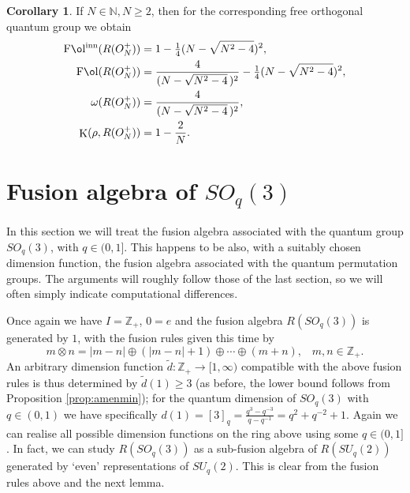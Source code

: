 \documentclass[11 pt, leqno]{amsart}
\newcommand{\NN}{\mathbb{N}}
\newcommand{\ZZ}{\mathbb{Z}}
\DeclareMathOperator{\Fol}{F\mathrm{\o}l}
\DeclareMathOperator{\Folinn}{F\mathrm{\o}l^{inn}}
\DeclareMathOperator{\Kaz}{K}
\theoremstyle{definition}
\newtheorem{corollary}[theorem]{Corollary}
\numberwithin{equation}{section}
\begin{document}

\begin{corollary} If $N\in \NN, N \geq 2$, then for the corresponding free orthogonal quantum group we obtain
\[\begin{split}
\Folinn(R(O_N^+)) &= 1 - \tfrac{1}{4} (N-\sqrt{N^2-4})^{2},\\
\Fol(R(O_N^+)) &=
\frac{4}{(N-\sqrt{N^2-4}\,)^{2}}
- \tfrac{1}{4} (N-\sqrt{N^2-4})^{2}, \\
\omega(R(O_N^+)) & = \frac{4}{(N-\sqrt{N^2-4}\,)^{2}}  , \\
\Kaz(\rho,R(O_N^+)) & = 1- \frac{2}{N}. 
\end{split}\]
\end{corollary}







\section{Fusion algebra of $SO_q(3)$}
\label{Sec:SO} 


In this section we will treat the fusion algebra associated with the quantum group $SO_q(3)$, with $q \in (0,1]$. This happens to be also, with a suitably chosen dimension function, the fusion algebra associated with the quantum permutation groups. The arguments will roughly follow those of the last section, so we will often simply  indicate  computational differences.

Once again we have $I=\ZZ_+$, $0=e$ and the fusion algebra $R(SO_q(3))$ is generated by $1$, with the fusion rules given this time by
\[ m \otimes n = |m-n| \oplus (|m-n|+1) \oplus \cdots \oplus (m+n), \;\;\; m,n \in \ZZ_+. \]
An arbitrary dimension function $\tilde{d}\colon \ZZ_+\to [1, \infty)$ compatible with the above fusion rules is thus determined by $\tilde{d}(1)\geq 3$ (as before, the lower bound follows from Proposition \ref{prop:amenmin}); for the quantum dimension of $SO_q(3)$ with $q \in (0,1)$ we have specifically $d(1)=[3]_q =\tfrac{q^3 - q^{-3}}{q- q^{-1}}= q^2 + q^{-2}+1$. Again we can realise all possible dimension functions on the ring above using some $q \in (0,1]$. In fact, we can study $R(SO_q(3))$ as a sub-fusion algebra of $R(SU_q(2))$ generated by `even' representations of $SU_q(2)$. This is clear from the fusion rules above and the next lemma.
\end{document}
